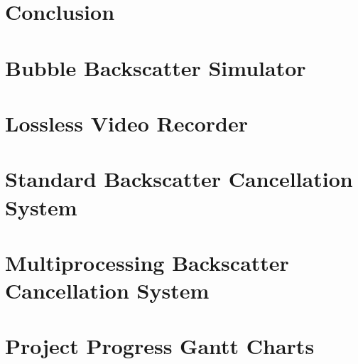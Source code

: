 \documentclass[12pt]{article}
\begin{document}
\section{Conclusion}
\label{conclusion}



\newpage



\newpage
\begin{appendices}
    \section{Bubble Backscatter Simulator}
    \label{sim}
    

    \section{Lossless Video Recorder}
    \label{pirec}
    

    \section{Standard Backscatter Cancellation System}
    \label{sys}
    

    \section{Multiprocessing Backscatter Cancellation System}
    \label{mpsys}
    

    \section{Project Progress Gantt Charts}
    \label{gantt}
    
\end{appendices}
\end{document}
